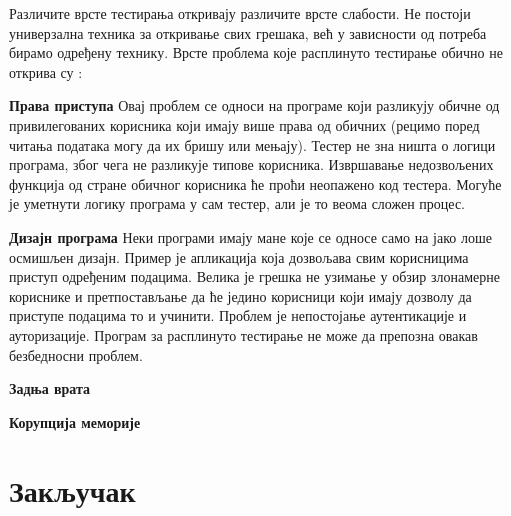 \documentclass[12pt,oneside]{memoir}
\begin{document}
Различите врсте тестирања откривају различите врсте слабости. Не постоји универзална техника за откривање свих грешака, већ у зависности од потреба бирамо одређену технику. Врсте проблема које расплинуто тестирање обично не открива су \cite{fuzzingBrute}:
\begin{description}
\item \textbf{Права приступа} Овај проблем се односи на програме који разликују обичне од привилегованих корисника који имају више права од обичних (рецимо поред читања података могу да их бришу или мењају). Тестер не зна ништа о логици програма, због чега не разликује типове корисника. Извршавање недозвољених функција од стране обичног корисника ће проћи неопажено код тестера. Могуће је уметнути логику програма у сам тестер, али је то веома сложен процес.  
\item \textbf{Дизајн програма} Неки програми имају мане које се односе само на јако лоше осмишљен дизајн. Пример је апликација која дозвољава свим корисницима приступ одређеним подацима. Велика је грешка не узимање у обзир злонамерне кориснике и претпостављање да ће једино корисници који имају дозволу да приступе подацима то и учинити. Проблем је непостојање аутентикације и ауторизације. Програм за расплинуто тестирање не може да препозна овакав безбедносни проблем.
\item \textbf{Задња врата}
\item \textbf{Корупција меморије}

\end{description}


\chapter{Закључак}

\literatura

\backmatter
\end{document}
